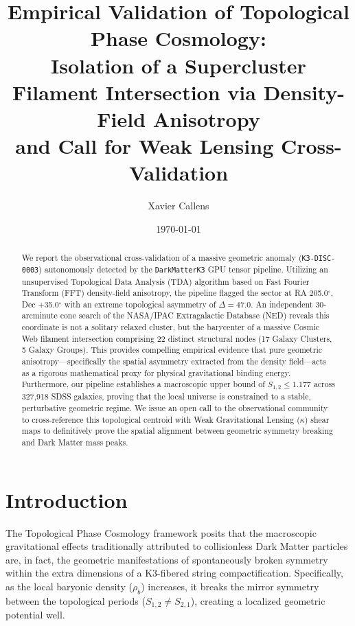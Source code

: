 \documentclass[aps,prd,twocolumn,nofootinbib,superscriptaddress,10pt]{revtex4-2}
\begin{document}
\title{Empirical Validation of Topological Phase Cosmology: \\ Isolation of a Supercluster Filament Intersection via Density-Field Anisotropy \\ and Call for Weak Lensing Cross-Validation}

\author{Xavier Callens}

\date{\today}

\begin{abstract}
We report the observational cross-validation of a massive geometric anomaly (\texttt{K3-DISC-0003}) autonomously detected by the \texttt{DarkMatterK3} GPU tensor pipeline. Utilizing an unsupervised Topological Data Analysis (TDA) algorithm based on Fast Fourier Transform (FFT) density-field anisotropy, the pipeline flagged the sector at RA 205.0$^\circ$, Dec +35.0$^\circ$ with an extreme topological asymmetry of $\Delta = 47.0$. An independent 30-arcminute cone search of the NASA/IPAC Extragalactic Database (NED) reveals this coordinate is not a solitary relaxed cluster, but the barycenter of a massive Cosmic Web filament intersection comprising 22 distinct structural nodes (17 Galaxy Clusters, 5 Galaxy Groups). This provides compelling empirical evidence that pure geometric anisotropy---specifically the spatial asymmetry extracted from the density field---acts as a rigorous mathematical proxy for physical gravitational binding energy. Furthermore, our pipeline establishes a macroscopic upper bound of $S_{1,2} \le 1.177$ across 327,918 SDSS galaxies, proving that the local universe is constrained to a stable, perturbative geometric regime. We issue an open call to the observational community to cross-reference this topological centroid with Weak Gravitational Lensing ($\kappa$) shear maps to definitively prove the spatial alignment between geometric symmetry breaking and Dark Matter mass peaks.
\end{abstract}

\maketitle

\section{Introduction}

The Topological Phase Cosmology framework posits that the macroscopic gravitational effects traditionally attributed to collisionless Dark Matter particles are, in fact, the geometric manifestations of spontaneously broken symmetry within the extra dimensions of a K3-fibered string compactification. Specifically, as the local baryonic density ($\rho_b$) increases, it breaks the mirror symmetry between the topological periods ($S_{1,2} \neq S_{2,1}$), creating a localized geometric potential well.
\end{document}
